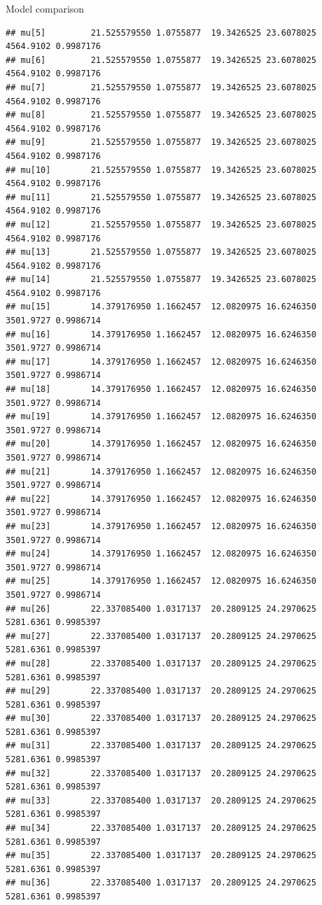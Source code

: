 \documentclass[
  ignorenonframetext,
]{beamer}
\begin{document}
\begin{frame}[fragile]{Model comparison}
\begin{verbatim}
## mu[5]         21.525579550 1.0755877  19.3426525 23.6078025 4564.9102 0.9987176
## mu[6]         21.525579550 1.0755877  19.3426525 23.6078025 4564.9102 0.9987176
## mu[7]         21.525579550 1.0755877  19.3426525 23.6078025 4564.9102 0.9987176
## mu[8]         21.525579550 1.0755877  19.3426525 23.6078025 4564.9102 0.9987176
## mu[9]         21.525579550 1.0755877  19.3426525 23.6078025 4564.9102 0.9987176
## mu[10]        21.525579550 1.0755877  19.3426525 23.6078025 4564.9102 0.9987176
## mu[11]        21.525579550 1.0755877  19.3426525 23.6078025 4564.9102 0.9987176
## mu[12]        21.525579550 1.0755877  19.3426525 23.6078025 4564.9102 0.9987176
## mu[13]        21.525579550 1.0755877  19.3426525 23.6078025 4564.9102 0.9987176
## mu[14]        21.525579550 1.0755877  19.3426525 23.6078025 4564.9102 0.9987176
## mu[15]        14.379176950 1.1662457  12.0820975 16.6246350 3501.9727 0.9986714
## mu[16]        14.379176950 1.1662457  12.0820975 16.6246350 3501.9727 0.9986714
## mu[17]        14.379176950 1.1662457  12.0820975 16.6246350 3501.9727 0.9986714
## mu[18]        14.379176950 1.1662457  12.0820975 16.6246350 3501.9727 0.9986714
## mu[19]        14.379176950 1.1662457  12.0820975 16.6246350 3501.9727 0.9986714
## mu[20]        14.379176950 1.1662457  12.0820975 16.6246350 3501.9727 0.9986714
## mu[21]        14.379176950 1.1662457  12.0820975 16.6246350 3501.9727 0.9986714
## mu[22]        14.379176950 1.1662457  12.0820975 16.6246350 3501.9727 0.9986714
## mu[23]        14.379176950 1.1662457  12.0820975 16.6246350 3501.9727 0.9986714
## mu[24]        14.379176950 1.1662457  12.0820975 16.6246350 3501.9727 0.9986714
## mu[25]        14.379176950 1.1662457  12.0820975 16.6246350 3501.9727 0.9986714
## mu[26]        22.337085400 1.0317137  20.2809125 24.2970625 5281.6361 0.9985397
## mu[27]        22.337085400 1.0317137  20.2809125 24.2970625 5281.6361 0.9985397
## mu[28]        22.337085400 1.0317137  20.2809125 24.2970625 5281.6361 0.9985397
## mu[29]        22.337085400 1.0317137  20.2809125 24.2970625 5281.6361 0.9985397
## mu[30]        22.337085400 1.0317137  20.2809125 24.2970625 5281.6361 0.9985397
## mu[31]        22.337085400 1.0317137  20.2809125 24.2970625 5281.6361 0.9985397
## mu[32]        22.337085400 1.0317137  20.2809125 24.2970625 5281.6361 0.9985397
## mu[33]        22.337085400 1.0317137  20.2809125 24.2970625 5281.6361 0.9985397
## mu[34]        22.337085400 1.0317137  20.2809125 24.2970625 5281.6361 0.9985397
## mu[35]        22.337085400 1.0317137  20.2809125 24.2970625 5281.6361 0.9985397
## mu[36]        22.337085400 1.0317137  20.2809125 24.2970625 5281.6361 0.9985397

\end{verbatim}
\end{frame}
\end{document}
